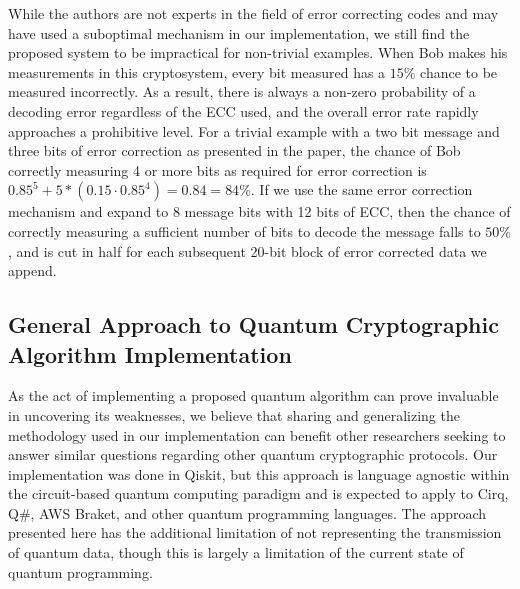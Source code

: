 \documentclass[sigconf]{acmart}
\begin{document}
While the authors are not experts in the field of error correcting codes and may have used a suboptimal mechanism in our implementation, we still find the proposed system to be impractical for non-trivial examples. When Bob makes his measurements in this cryptosystem, every bit measured has a $15\%$ chance to be measured incorrectly. As a result, there is always a non-zero probability of a decoding error regardless of the ECC used, and the overall error rate rapidly approaches a prohibitive level. For a trivial example with a two bit message and three bits of error correction as presented in the paper, the chance of Bob correctly measuring 4 or more bits as required for error correction is $0.85^5 + 5*(0.15\cdot 0.85^4) = 0.84 = 84\%$. If we use the same error correction mechanism and expand to 8 message bits with 12 bits of ECC, then the chance of correctly measuring a sufficient number of bits to decode the message falls to $50\%$, and is cut in half for each subsequent 20-bit block of error corrected data we append.


\subsection{General Approach to Quantum Cryptographic Algorithm Implementation}
As the act of implementing a proposed quantum algorithm can prove invaluable in uncovering its weaknesses, we believe that sharing and generalizing the methodology used in our implementation can benefit other researchers seeking to answer similar questions regarding other quantum cryptographic protocols. Our implementation was done in Qiskit, but this approach is language agnostic within the circuit-based quantum computing paradigm and is expected to apply to Cirq, Q\#, AWS Braket, and other quantum programming languages. The approach presented here has the additional limitation of not representing the transmission of quantum data, though this is largely a limitation of the current state of quantum programming.
\end{document}
